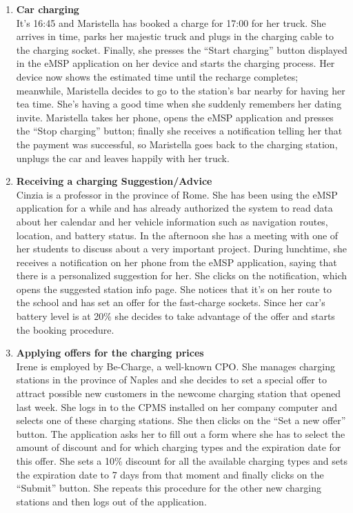 \begin{enumerate}
\item \textbf{Car charging}\\
It’s 16:45 and Maristella has booked a charge for 17:00 for her truck. She arrives in time, parks her majestic truck and plugs in the charging cable to the charging socket. Finally, she presses the “Start charging” button displayed in the eMSP application on her device and starts the charging process. Her device now shows the estimated time until the recharge completes; meanwhile, Maristella decides to go to the station’s bar nearby for having her tea time. 
She’s having a good time when she suddenly remembers her dating invite.
Maristella takes her phone, opens the eMSP application and presses the “Stop charging” button; finally she receives a notification telling her that the payment was successful, so Maristella goes back to the charging station, unplugs the car and leaves happily with her truck.
\item \textbf{Receiving a charging Suggestion/Advice}\\
Cinzia is a professor in the province of Rome. She has been using the eMSP application for a while and has already authorized the system to read data about her calendar and her vehicle information such as navigation routes, location, and battery status. In the afternoon she has a meeting with one of her students to discuss about a very important project.  During lunchtime, she receives a notification on her phone from the eMSP application, saying that there is a personalized suggestion for her. She clicks on the notification, which opens the suggested station info page. She notices that it's on her route to the school and has set an offer for the fast-charge sockets. Since her car's battery level is at 20\% she decides to take advantage of the offer and starts the booking procedure.
\item \textbf{Applying offers for the charging prices}\\
Irene is employed by Be-Charge, a well-known CPO. She manages charging stations in the province of Naples and she decides to set a special offer to attract possible new customers in the newcome charging station that opened last week.
She logs in to the CPMS installed on her company computer and selects one of these charging stations. She then clicks on the “Set a new offer” button. The application asks her to fill out a form where she has to select the amount of discount and for which charging types and the expiration date for this offer. She sets a 10\% discount for all the available charging types and sets the expiration date to 7 days from that moment and finally clicks on the “Submit” button. She repeats this procedure for the other new charging stations and then logs out of the application.

\end{enumerate}
